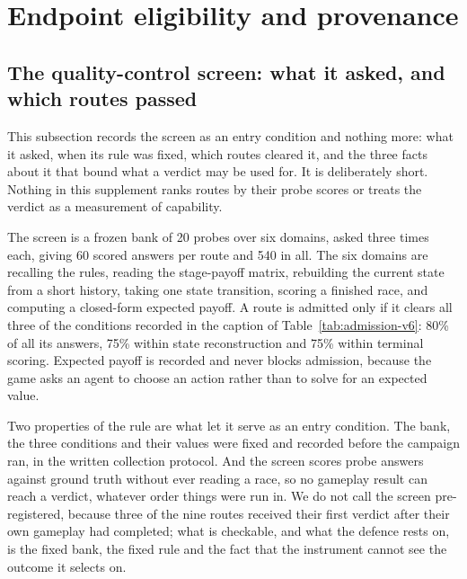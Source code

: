 \documentclass[sigconf,anonymous]{aamas}
\begin{document}
\section{Endpoint eligibility and provenance}

\subsection{The quality-control screen: what it asked, and which routes passed}
\label{app:admission-v6}

This subsection records the screen as an entry condition and nothing more: what
it asked, when its rule was fixed, which routes cleared it, and the three facts
about it that bound what a verdict may be used for. It is deliberately short.
Nothing in this supplement ranks routes by their probe scores or treats the
verdict as a measurement of capability.

The screen is a frozen bank of 20 probes over six domains, asked three times
each, giving 60 scored answers per route and 540 in all. The six domains are
recalling the rules, reading the stage-payoff matrix, rebuilding the current
state from a short history, taking one state transition, scoring a finished
race, and computing a closed-form expected payoff. A route is admitted only if
it clears all three of the conditions recorded in the caption of
Table~\ref{tab:admission-v6}: 80\% of all its answers, 75\% within state
reconstruction and 75\% within terminal scoring. Expected payoff is recorded
and never blocks admission, because the game asks an agent to choose an action
rather than to solve for an expected value.

Two properties of the rule are what let it serve as an entry condition. The
bank, the three conditions and their values were fixed and recorded before the
campaign ran, in the written collection protocol. And the screen
scores probe answers against ground truth without ever reading a race, so no
gameplay result can reach a verdict, whatever order things were run in. We do
not call the screen pre-registered, because three of the nine routes received
their first verdict after their own gameplay had completed; what is checkable,
and what the defence rests on, is the fixed bank, the fixed rule and the fact
that the instrument cannot see the outcome it selects on.
\end{document}

